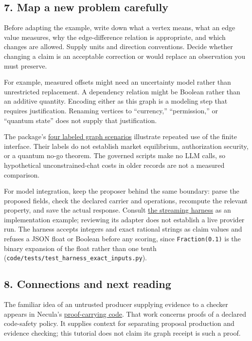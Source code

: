 \documentclass[
  11pt,
]{article}
\begin{document}
\hypertarget{map-a-new-problem-carefully}{%
\subsection{7. Map a new problem
carefully}\label{map-a-new-problem-carefully}}

Before adapting the example, write down what a vertex means, what an
edge value measures, why the edge-difference relation is appropriate,
and which changes are allowed. Supply units and direction conventions.
Decide whether changing a claim is an acceptable correction or would
replace an observation you must preserve.

For example, measured offsets might need an uncertainty model rather
than unrestricted replacement. A dependency relation might be Boolean
rather than an additive quantity. Encoding either as this graph is a
modeling step that requires justification. Renaming vertices to
``currency,'' ``permission,'' or ``quantum state'' does not supply that
justification.

The package's \href{code/multi_domain_symbol_game_bouts.py}{four labeled
graph scenarios} illustrate repeated use of the finite interface. Their
labels do not establish market equilibrium, authorization security, or a
quantum no-go theorem. The governed scripts make no LLM calls, so
hypothetical unconstrained-chat costs in older records are not a
measured comparison.

For model integration, keep the proposer behind the same boundary: parse
the proposed fields, check the declared carrier and operations,
recompute the relevant property, and save the actual response. Consult
\href{code/llm_streaming_harness.py}{the streaming harness} as an
implementation example; reviewing its adapter does not establish a live
provider run. The harness accepts integers and exact rational strings as
claim values and refuses a JSON float or Boolean before any scoring,
since \texttt{Fraction(0.1)} is the binary expansion of the float rather
than one tenth (\texttt{code/tests/test\_harness\_exact\_inputs.py}).

\hypertarget{connections-and-next-reading}{%
\subsection{8. Connections and next
reading}\label{connections-and-next-reading}}

The familiar idea of an untrusted producer supplying evidence to a
checker appears in Necula's
\href{https://doi.org/10.1145/263699.263712}{proof-carrying code}. That
work concerns proofs of a declared code-safety policy. It supplies
context for separating proposal production and evidence checking; this
tutorial does not claim its graph receipt is such a proof.
\end{document}
